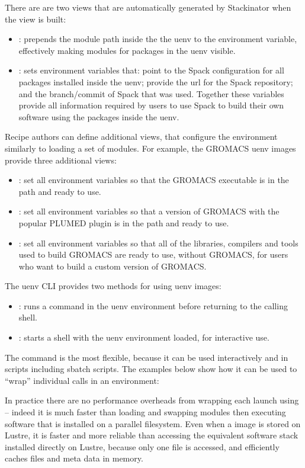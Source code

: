 There are are two views that are automatically generated by Stackinator when the view is built:
\begin{itemize}
    \item{}: prepends the module path inside the the uenv to the  environment variable, effectively making modules for packages in the uenv visible.
    \item{}: sets environment variables that: point to the Spack configuration for all packages installed inside the uenv; provide the url for the Spack repository; and the branch/commit of Spack that was used.
        Together these variables provide all information required by users to use Spack to build their own software using the packages inside the uenv.
\end{itemize}

Recipe authors can define additional views, that configure the environment similarly to loading a set of modules.
For example, the GROMACS uenv images provide three additional views:
\begin{itemize}
    \item {}: set all environment variables so that the GROMACS executable is in the path and ready to use.
    \item {}: set all environment variables so that a version of GROMACS with the popular PLUMED plugin is in the path and ready to use.
    \item {}: set all environment variables so that all of the libraries, compilers and tools used to build GROMACS are ready to use, without GROMACS, for users who want to build a custom version of GROMACS.
\end{itemize}


The uenv CLI provides two methods for using uenv images:
\begin{itemize}
\item{}: runs a command in the uenv environment before returning to the calling shell.
\item{}: starts a shell with the uenv environment loaded, for interactive use.
\end{itemize}

The  command is the most flexible, because it can be used interactively and in scripts including sbatch scripts.
The examples below show how it can be used to ``wrap'' individual calls in an environment:

In practice there are no performance overheads from wrapping each launch using  -- indeed it is much faster than loading and swapping modules then executing software that is installed on a parallel filesystem.
Even when a \squashfs image is stored on Lustre, it is faster and more reliable than accessing the equivalent software stack installed directly on Lustre, because only one file is accessed, and \squashfs efficiently caches files and meta data in memory.

